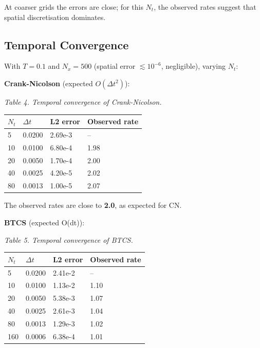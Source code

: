 \documentclass[11pt,a4paper]{article}
\begin{document}
At coarser grids the errors are close; for this $N_t$, the observed rates suggest that spatial discretisation dominates.

\subsection{Temporal Convergence}

With $T=0.1$ and $N_x = 500$ (spatial error $\lesssim 10^{-6}$, negligible), varying $N_t$:

\textbf{Crank-Nicolson} (expected $O(\Delta t^2)$):

\emph{Table 4. Temporal convergence of Crank-Nicolson.}

\begin{center}
\renewcommand{\arraystretch}{1.15}
\begin{tabular}{|p{}|p{}|p{}|p{}|}
\hline
$N_t$ & $\Delta t$ & L2 error & Observed rate \\
\hline
5 & 0.0200 & 2.69e-3 & -- \\
10 & 0.0100 & 6.80e-4 & 1.98 \\
20 & 0.0050 & 1.70e-4 & 2.00 \\
40 & 0.0025 & 4.20e-5 & 2.02 \\
80 & 0.0013 & 1.00e-5 & 2.07 \\
\hline
\end{tabular}
\end{center}

The observed rates are close to \textbf{2.0}, as expected for CN.

\textbf{BTCS} (expected O(dt)):

\emph{Table 5. Temporal convergence of BTCS.}

\begin{center}
\renewcommand{\arraystretch}{1.15}
\begin{tabular}{|p{}|p{}|p{}|p{}|}
\hline
$N_t$ & $\Delta t$ & L2 error & Observed rate \\
\hline
5 & 0.0200 & 2.41e-2 & -- \\
10 & 0.0100 & 1.13e-2 & 1.10 \\
20 & 0.0050 & 5.38e-3 & 1.07 \\
40 & 0.0025 & 2.61e-3 & 1.04 \\
80 & 0.0013 & 1.29e-3 & 1.02 \\
160 & 0.0006 & 6.38e-4 & 1.01 \\
\hline
\end{tabular}
\end{center}
\end{document}
